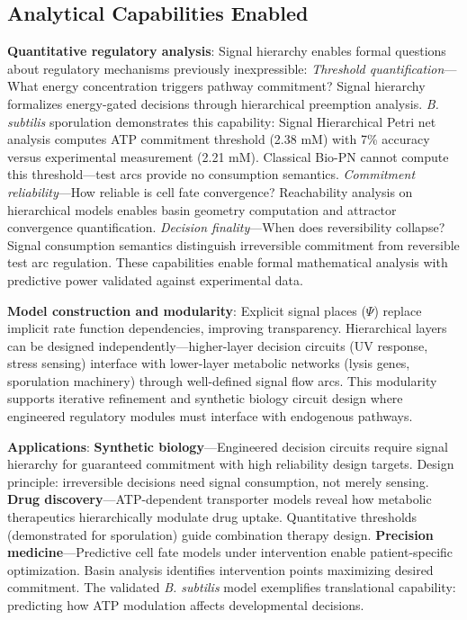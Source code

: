 \subsection{Analytical Capabilities Enabled}

\vspace{3pt}
\noindent\textbf{Quantitative regulatory analysis}: Signal hierarchy enables formal questions about regulatory mechanisms previously inexpressible: \textit{Threshold quantification}---What energy concentration triggers pathway commitment? Signal hierarchy formalizes energy-gated decisions through hierarchical preemption analysis. \textit{B. subtilis} sporulation demonstrates this capability: Signal Hierarchical Petri net analysis computes ATP commitment threshold (2.38 mM) with 7\% accuracy versus experimental measurement (2.21 mM). Classical Bio-PN cannot compute this threshold---test arcs provide no consumption semantics. \textit{Commitment reliability}---How reliable is cell fate convergence? Reachability analysis on hierarchical models enables basin geometry computation and attractor convergence quantification. \textit{Decision finality}---When does reversibility collapse? Signal consumption semantics distinguish irreversible commitment from reversible test arc regulation. These capabilities enable formal mathematical analysis with predictive power validated against experimental data.

\vspace{3pt}
\noindent\textbf{Model construction and modularity}: Explicit signal places ($\Psi$) replace implicit rate function dependencies, improving transparency. Hierarchical layers can be designed independently---higher-layer decision circuits (UV response, stress sensing) interface with lower-layer metabolic networks (lysis genes, sporulation machinery) through well-defined signal flow arcs. This modularity supports iterative refinement and synthetic biology circuit design where engineered regulatory modules must interface with endogenous pathways.

\vspace{3pt}
\noindent\textbf{Applications}: \textbf{Synthetic biology}---Engineered decision circuits require signal hierarchy for guaranteed commitment with high reliability design targets. Design principle: irreversible decisions need signal consumption, not merely sensing. \textbf{Drug discovery}---ATP-dependent transporter models reveal how metabolic therapeutics hierarchically modulate drug uptake. Quantitative thresholds (demonstrated for sporulation) guide combination therapy design. \textbf{Precision medicine}---Predictive cell fate models under intervention enable patient-specific optimization. Basin analysis identifies intervention points maximizing desired commitment. The validated \textit{B. subtilis} model exemplifies translational capability: predicting how ATP modulation affects developmental decisions.

